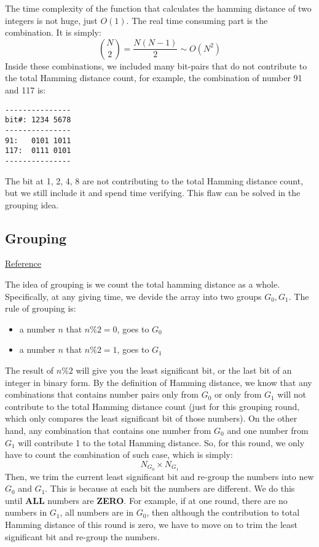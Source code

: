 \documentclass[12pt]{book}
\begin{document}
The time complexity of the function that calculates the hamming distance of two integers is not huge, just \(O(1)\). The real time consuming part is the combination. It is simply:
\[
{N \choose 2} = \frac{N(N-1)}{2} \sim O(N^2)
\]
Inside these combinations, we included many bit-pairs that do not contribute to the total Hamming distance count, for example, the combination of number 91 and 117 is:
\begin{verbatim}
---------------
bit#: 1234 5678
---------------
91:   0101 1011
117:  0111 0101
---------------
\end{verbatim}
The bit at 1, 2, 4, 8 are not contributing to the total Hamming distance count, but we still include it and spend time verifying. This flaw can be solved in the grouping idea.

\subsection{Grouping}
\label{sec:org4c2485d}
\href{https://leetcode.com/problems/total-hamming-distance/discuss/96250/C++-O(n)-runtime-O(1)-space}{Reference}

The idea of grouping is we count the total hamming distance as a whole. Specifically, at any giving time, we devide the array into two groups \(G_0, G_1\). The rule of grouping is:
\begin{itemize}
\item a number \(n\) that \(n \% 2 = 0\), goes to \(G_0\)
\item a number \(n\) that \(n \% 2 = 1\), goes to \(G_1\)
\end{itemize}
The result of \(n\%2\) will give you the least significant bit, or the last bit of an integer in binary form. By the definition of Hamming distance, we know that any combinations that contains number pairs only from \(G_0\) or only from \(G_1\) will not contribute to the total Hamming distance count (just for this grouping round, which only compares the least significant bit of those numbers). On the other hand, any combination that contains one number from \(G_0\) and one number from \(G_1\) will contribute 1 to the total Hamming distance. So, for this round, we only have to count the combination of such case, which is simply:
\[
N_{G_0} \times N_{G_1}
\]
Then, we trim the current least significant bit and re-group the numbers into new \(G_0\) and \(G_1\). This is because at each bit the numbers are different. We do this until \textbf{ALL} numbers are \textbf{ZERO}. For example, if at one round, there are no numbers in \(G_1\), all numbers are in \(G_0\), then although the contribution to total Hamming distance of this round is zero, we have to move on to trim the least significant bit and re-group the numbers.
\end{document}
